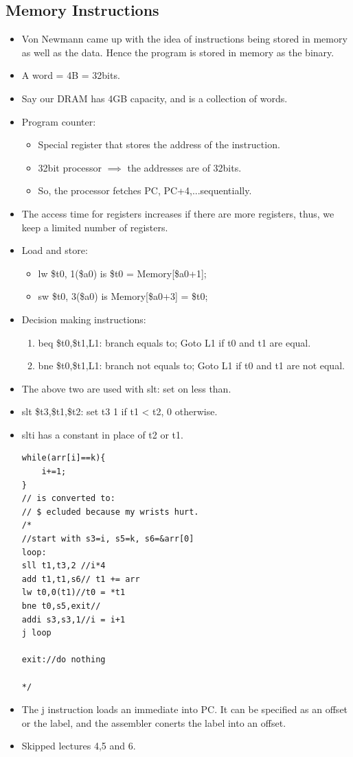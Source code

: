 \documentclass{report}
\begin{document}
\subsection{Memory Instructions}
\begin{itemize}
\item Von Newmann came up with the idea of instructions being stored in memory as well as the data. Hence the program is stored in memory as the binary.
\item A word = 4B = 32bits.
\item Say our DRAM has 4GB capacity, and is a collection of words.
\item Program counter:
\begin{itemize}
\item Special register that stores the address of the instruction.
\item 32bit processor $\implies$ the addresses are of 32bits.
\item So, the processor fetches PC, PC+4,...sequentially.
\end{itemize}
\item The access time for registers increases if there are more registers, thus, we keep a limited number of registers.
\item Load and store:
\begin{itemize}
    \item lw \$t0, 1(\$a0) is \$t0 = Memory[\$a0+1];
    \item sw \$t0, 3(\$a0) is Memory[\$a0+3] = \$t0;
\end{itemize}
\item Decision making instructions:
\begin{enumerate}
    \item beq \$t0,\$t1,L1: branch equals to; Goto L1 if t0 and t1 are equal.
    \item bne \$t0,\$t1,L1: branch not equals to; Goto L1 if t0 and t1 are not equal.
\end{enumerate}
\item The above two are used with slt: set on less than.
\item slt \$t3,\$t1,\$t2: set t3 1 if t1 < t2, 0 otherwise.
\item slti has a constant in place of t2 or t1.
\begin{lstlisting}
while(arr[i]==k){
    i+=1;
}
// is converted to:
// $ ecluded because my wrists hurt.
/*
//start with s3=i, s5=k, s6=&arr[0]
loop:
sll t1,t3,2 //i*4
add t1,t1,s6// t1 += arr
lw t0,0(t1)//t0 = *t1
bne t0,s5,exit//
addi s3,s3,1//i = i+1
j loop

exit://do nothing

*/
\end{lstlisting}
\item The j instruction loads an immediate into PC. It can be specified as an offset or the label, and the assembler conerts the label into an offset.
\item Skipped lectures 4,5 and 6.
\end{itemize}
\end{document}
